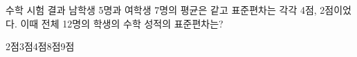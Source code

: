 수학 시험 결과 남학생 5명과 여학생 7명의 평균은 같고 표준편차는 각각 4점, 2점이었다. 이때 전체 12명의 학생의 수학 성적의 표준편차는?
\begin{choices32}{2점}{3점}{4점}{8점}{9점}\end{choices32}

